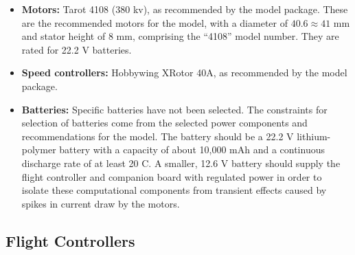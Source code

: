 \begin{itemize}
    \item \textbf{Motors:} Tarot 4108 (380 kv), as recommended by the model package. These are the recommended motors for the model, with a diameter of $40.6 \approx 41$ mm and stator height of $8$ mm, comprising the ``4108'' model number. They are rated for 22.2 V batteries.

    \item \textbf{Speed controllers:} Hobbywing XRotor 40A, as recommended by the model package.


    \item \textbf{Batteries:} Specific batteries have not been selected. The constraints for selection of batteries come from the selected power components and recommendations for the model. The battery should be a 22.2 V lithium-polymer battery with a capacity of about 10,000 mAh and a continuous discharge rate of at least 20 C. A smaller, 12.6 V battery should supply the flight controller and companion board with regulated power in order to isolate these computational components from transient effects caused by spikes in current draw by the motors.

\end{itemize}

\subsection{Flight Controllers}
\label{section:flight_controllers}

